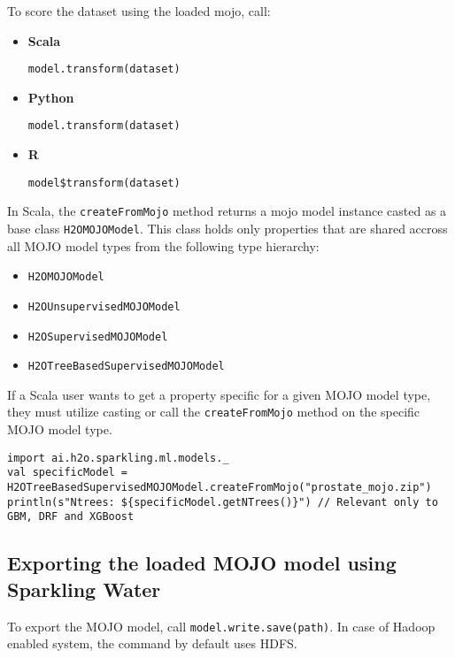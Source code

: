 To score the dataset using the loaded mojo, call:

\begin{itemize}
    \item \textbf{Scala} \begin{lstlisting}[style=Scala]
model.transform(dataset)
    \end{lstlisting}
    \item \textbf{Python} \begin{lstlisting}[style=Python]
model.transform(dataset)
    \end{lstlisting}
    \item \textbf{R} \begin{lstlisting}[style=R]
model$transform(dataset)
    \end{lstlisting}
\end{itemize}


In Scala, the \texttt{createFromMojo} method returns a mojo model instance casted as a base class \texttt{H2OMOJOModel}. This class holds
only properties that are shared accross all MOJO model types from the following type hierarchy:

\begin{itemize}
    \item \texttt{H2OMOJOModel}
    \item \texttt{H2OUnsupervisedMOJOModel}
    \item \texttt{H2OSupervisedMOJOModel}
    \item \texttt{H2OTreeBasedSupervisedMOJOModel}
\end{itemize}

If a Scala user wants to get a property specific for a given MOJO model type, they must utilize casting or
call the \texttt{createFromMojo} method on the specific MOJO model type.

\begin{lstlisting}[style=Scala]
import ai.h2o.sparkling.ml.models._
val specificModel = H2OTreeBasedSupervisedMOJOModel.createFromMojo("prostate_mojo.zip")
println(s"Ntrees: ${specificModel.getNTrees()}") // Relevant only to GBM, DRF and XGBoost
\end{lstlisting}

\subsection{Exporting the loaded MOJO model using Sparkling Water}

To export the MOJO model, call \texttt{model.write.save(path)}. In case of Hadoop enabled system, the command by default
uses HDFS.

